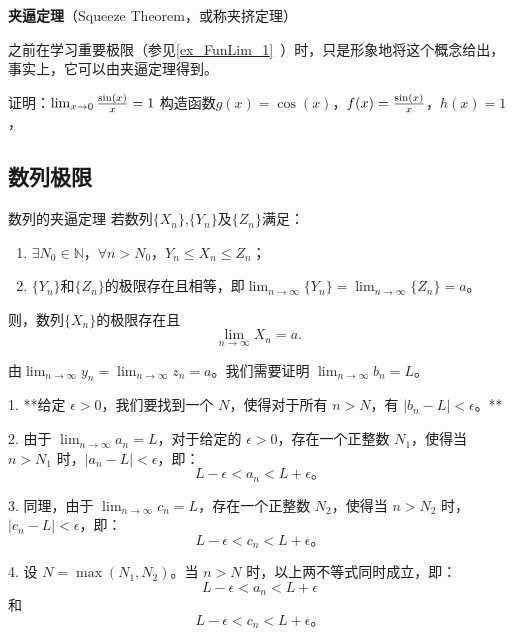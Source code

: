 
\begin{issues}
\issueDraft
\end{issues}
\textbf{夹逼定理}（Squeeze Theorem，或称夹挤定理）

之前在学习重要极限（参见\autoref{ex_FunLim_1}~）时，只是形象地将这个概念给出，事实上，它可以由夹逼定理得到。
\begin{example}{证明：$\lim_{x\to0}{\sin(x)\over x}=1$}
构造函数$g(x)=\cos(x)$，$f(x)={\sin(x)\over x}$，$h(x)=1$，
\end{example}

\subsection{数列极限}

\begin{theorem}{数列的夹逼定理}
若数列$\{X_n\}$,$\{Y_n\}$及$\{Z_n\}$满足：
\begin{enumerate}
\item $\exists N_0\in \mathbb{N}$，$\forall n>N_0$，$Y_n\leq X_n\leq Z_n$；
\item $\{Y_n\}$和$\{Z_n\}$的极限存在且相等，即$\lim_{n\to\infty}\{Y_n\}=\lim_{n\to\infty}\{Z_n\}=a$。
\end{enumerate}
则，数列$\{X_n\}$的极限存在且
\begin{equation}
\lim_{n\to\infty}X_n =a.~
\end{equation}
\end{theorem}


由$\lim_{n \to \infty} y_n = \lim_{n \to \infty} z_n = a$。我们需要证明 $\lim_{n \to \infty} b_n = L$。

1. **给定 $\epsilon > 0$，我们要找到一个 $N$，使得对于所有 $n > N$，有 $|b_n - L| < \epsilon$。**

2. 由于 $\lim_{n \to \infty} a_n = L$，对于给定的 $\epsilon > 0$，存在一个正整数 $N_1$，使得当 $n > N_1$ 时，$|a_n - L| < \epsilon$，即：
   \[
   L - \epsilon < a_n < L + \epsilon。
   \]

3. 同理，由于 $\lim_{n \to \infty} c_n = L$，存在一个正整数 $N_2$，使得当 $n > N_2$ 时，$|c_n - L| < \epsilon$，即：
   \[
   L - \epsilon < c_n < L + \epsilon。
   \]

4. 设 $N = \max(N_1, N_2)$。当 $n > N$ 时，以上两不等式同时成立，即：
   \[
   L - \epsilon < a_n < L + \epsilon
   \]
   和
   \[
   L - \epsilon < c_n < L + \epsilon。
   \]

